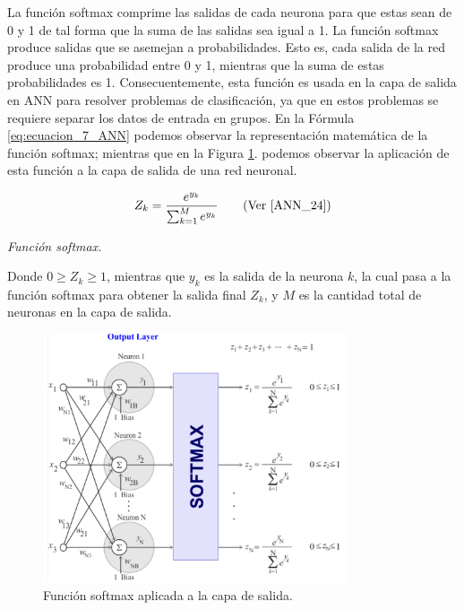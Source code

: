 \documentclass[12pt,a4paper]{article}
\begin{document}
\begin{sloppypar}
La función softmax comprime las salidas de cada neurona para que estas sean de 0 y 1 de tal forma que la suma de las salidas sea igual a 1. La función softmax produce salidas que se asemejan a probabilidades. Esto es, cada salida de la red produce una probabilidad entre 0 y 1, mientras que la suma de estas probabilidades es 1. Consecuentemente, esta función es usada en la capa de salida en ANN para resolver problemas de clasificación, ya que en estos problemas se requiere separar los datos de entrada en grupos. 
En la Fórmula \ref{eq:ecuacion_7_ANN} podemos observar la representación matemática de la función softmax; mientras que en la Figura \ref{fig:ann_4}. podemos observar la aplicación de esta función a la capa de salida de una red neuronal.

\begin{equation}\label{eq:ecuacion_7_ANN}
Z_k= \frac{e^{y_k}}{\sum_{k=1}^{M}e^{y_k}} \qquad \text{(Ver \cite{ANN_24})}
\end{equation}
\begin{center}
\textit{Función softmax.}
\end{center}

Donde $0 \geq Z_k \geq 1$, mientras que $y_k$ es la salida de la neurona $k$, la cual pasa a la función softmax para obtener la salida final $Z_k$, y $M$ es la cantidad total de neuronas en la capa de salida.     

\begin{figure}[H]    %
\centering
\includegraphics[width=0.8\textwidth]{images/ANN/4-ANN.png}
\caption[Función softmax aplicada a la capa de salida.]{Función softmax aplicada a la capa de salida\protect\footnotemark .}
 \label{fig:ann_4}
\end{figure}


\end{sloppypar}
\end{document}
